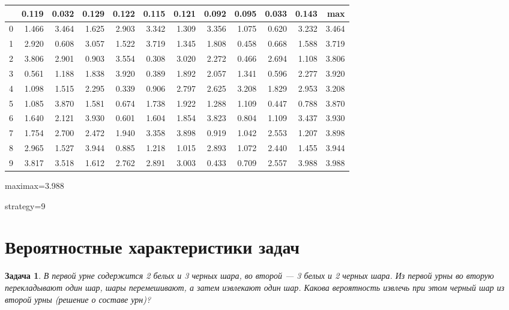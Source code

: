 \documentclass[14pt,a4paper]{extarticle}%
\newtheorem{task}[theorem]{Задача}
\begin{document}
\begin{tabular}{lrrrrrrrrrrr}
  \toprule
  {} &  0.119 &  0.032 &  0.129 &  0.122 &  0.115 &  0.121 &  0.092 &  0.095 &  0.033 &  0.143 &    max \\
  \midrule
  0 &  1.466 &  3.464 &  1.625 &  2.903 &  3.342 &  1.309 &  3.356 &  1.075 &  0.620 &  3.232 &  3.464 \\
  1 &  2.920 &  0.608 &  3.057 &  1.522 &  3.719 &  1.345 &  1.808 &  0.458 &  0.668 &  1.588 &  3.719 \\
  2 &  3.806 &  2.901 &  0.903 &  3.554 &  0.308 &  3.020 &  2.272 &  0.466 &  2.694 &  1.108 &  3.806 \\
  3 &  0.561 &  1.188 &  1.838 &  3.920 &  0.389 &  1.892 &  2.057 &  1.341 &  0.596 &  2.277 &  3.920 \\
  4 &  1.098 &  1.515 &  2.295 &  0.339 &  0.906 &  2.797 &  2.625 &  3.208 &  1.829 &  2.953 &  3.208 \\
  5 &  1.085 &  3.870 &  1.581 &  0.674 &  1.738 &  1.922 &  1.288 &  1.109 &  0.447 &  0.788 &  3.870 \\
  6 &  1.640 &  2.121 &  3.930 &  0.601 &  1.604 &  1.854 &  3.823 &  0.804 &  1.109 &  3.437 &  3.930 \\
  7 &  1.754 &  2.700 &  2.472 &  1.940 &  3.358 &  3.898 &  0.919 &  1.042 &  2.553 &  1.207 &  3.898 \\
  8 &  2.965 &  1.527 &  3.944 &  0.885 &  1.218 &  1.015 &  2.893 &  1.072 &  2.440 &  1.455 &  3.944 \\
  9 &  3.817 &  3.518 &  1.612 &  2.762 &  2.891 &  3.003 &  0.433 &  0.709 &  2.557 &  3.988 &  3.988 \\
  \bottomrule
\end{tabular}

maximax=3.988

strategy=9

\section{Вероятностные характеристики задач}
\begin{task}
  В первой урне содержится 2 белых и 3 черных шара,  во второй ---
  3 белых и 2 черных шара. Из первой урны во вторую перекладывают
  один шар, шары перемешивают, а затем извлекают один шар.
  Какова вероятность извлечь при этом черный шар из второй урны
  (решение о составе урн)?
\end{task}
\end{document}
